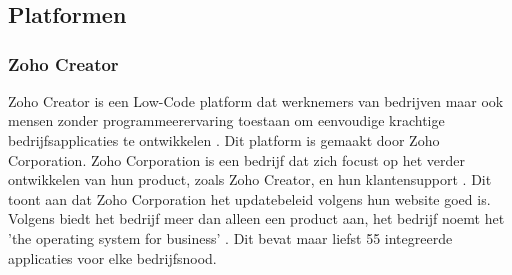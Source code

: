 \chapter{}%
\label{ch:evaluatie-en-selectie-van-alternatieven}
\section{Platformen}%
\label{sec:platformen}

\subsection{Zoho Creator}%
\label{subsec:zoho-creator}

Zoho Creator is een Low-Code platform dat werknemers van bedrijven maar ook mensen zonder programmeerervaring toestaan
om eenvoudige krachtige bedrijfsapplicaties te ontwikkelen \autocite{Computer2022}. Dit platform is gemaakt door Zoho Corporation.
Zoho Corporation is een bedrijf dat zich focust op het verder ontwikkelen van hun product, zoals Zoho Creator, en hun klantensupport \autocite{ZohoCorporation2024a}. Dit toont aan dat Zoho Corporation
het updatebeleid volgens hun website goed is. Volgens \textcite{ZohoCorporation2024a} biedt het bedrijf meer dan alleen een product aan, het bedrijf noemt het 'the operating system for business' \autocite{ZohoCorporation2024a}.
Dit bevat maar liefst 55 integreerde applicaties voor elke bedrijfsnood.


